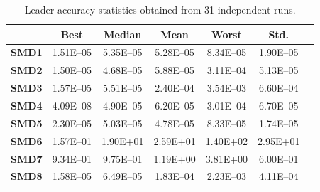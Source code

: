 \documentclass[conference]{IEEEtran}
\begin{document}
\begin{table}[!t]
\renewcommand{\arraystretch}{1.3}
    \caption{Leader accuracy statistics obtained from 31 independent runs.}
    \label{tab:leader}
    \centering
    \begin{tabular}{|c|c|c|c|c|c|c|}
\hline
&\textbf{Best}&\textbf{Median}&\textbf{Mean}&\textbf{Worst}&\textbf{Std.}\\ \hline 
\textbf{SMD1} & 1.51E--05 & 5.35E--05 & 5.28E--05 & 8.34E--05 & 1.90E--05 \\ \hline 
\textbf{SMD2} & 1.50E--05 & 4.68E--05 & 5.88E--05 & 3.11E--04 & 5.13E--05 \\ \hline 
\textbf{SMD3} & 1.57E--05 & 5.51E--05 & 2.40E--04 & 3.54E--03 & 6.60E--04 \\ \hline 
\textbf{SMD4} & 4.09E--08 & 4.90E--05 & 6.20E--05 & 3.01E--04 & 6.70E--05 \\ \hline 
\textbf{SMD5} & 2.30E--05 & 5.03E--05 & 4.78E--05 & 8.33E--05 & 1.74E--05 \\ \hline 
\textbf{SMD6} & 1.57E--01 &  1.90E+01 &  2.59E+01 &  1.40E+02 &  2.95E+01 \\ \hline 
\textbf{SMD7} & 9.34E--01 & 9.75E--01 &  1.19E+00 &  3.81E+00 & 6.00E--01 \\ \hline 
\textbf{SMD8} & 1.58E--05 & 6.49E--05 & 1.83E--04 & 2.23E--03 & 4.11E--04 \\ \hline 
    \end{tabular}
\end{table}
\end{document}
